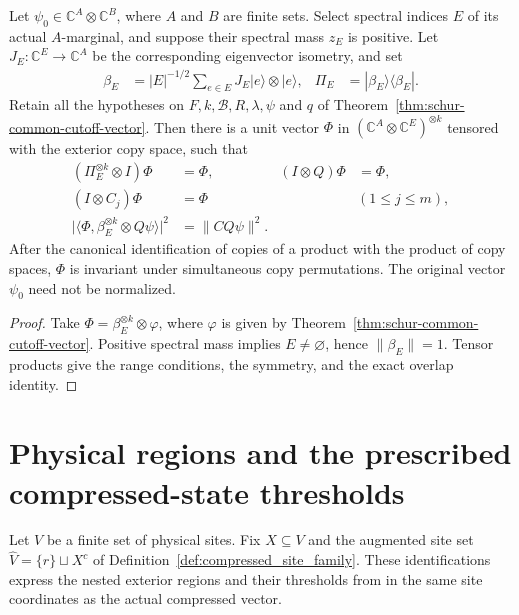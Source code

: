 \begin{theorem}
\label{thm:schur-common-cutoff-bell}
\leanok
{}
Let $\psi_0\in\mathbb C^A\otimes\mathbb C^B$, where $A$ and $B$ are
finite sets. Select spectral indices $E$ of its actual $A$-marginal,
and suppose their spectral mass $z_E$ is positive. Let
$J_E:\mathbb C^E\to\mathbb C^A$ be the corresponding eigenvector
isometry, and set
\begin{align}
 \beta_E&=|E|^{-1/2}\sum_{e\in E}J_E|e\rangle\otimes|e\rangle,
 &\Pi_E&=|\beta_E\rangle\langle\beta_E|.
\end{align}
Retain all the hypotheses on $F,k,\mathcal B,R,\lambda,\psi$ and $q$
of Theorem~\ref{thm:schur-common-cutoff-vector}. Then there is a unit
vector $\Phi$ in $(\mathbb C^A\otimes\mathbb C^E)^{\otimes k}$ tensored
with the exterior copy space, such that
\begin{align}
 (\Pi_E^{\otimes k}\otimes I)\Phi&=\Phi,
 &(I\otimes Q)\Phi&=\Phi,\\
 (I\otimes C_j)\Phi&=\Phi &&(1\le j\le m),\\
 \bigl|\langle\Phi,\beta_E^{\otimes k}\otimes Q\psi\rangle\bigr|^2
 &=\|CQ\psi\|^2.
\end{align}
After the canonical identification of copies of a product with the product
of copy spaces, $\Phi$ is invariant under simultaneous copy permutations.
The original vector $\psi_0$ need not be normalized.
\end{theorem}
\begin{proof}
\leanok
Take $\Phi=\beta_E^{\otimes k}\otimes\varphi$, where $\varphi$ is given
by Theorem~\ref{thm:schur-common-cutoff-vector}. Positive spectral mass
implies $E\ne\varnothing$, hence $\|\beta_E\|=1$. Tensor products give
the range conditions, the symmetry, and the exact overlap identity.
\end{proof}

\section{Physical regions and the prescribed compressed-state thresholds}
\label{sec:compressed_physical_regions}

Let $V$ be a finite set of physical sites. Fix $X\subseteq V$ and the augmented site
set $\widehat V=\{r\}\sqcup X^c$ of
Definition~\ref{def:compressed_site_family}. These identifications express
the nested exterior regions and their thresholds from
\cite[Section~7]{OpenAI2026AreaLaw} in the same site coordinates as the
actual compressed vector.

